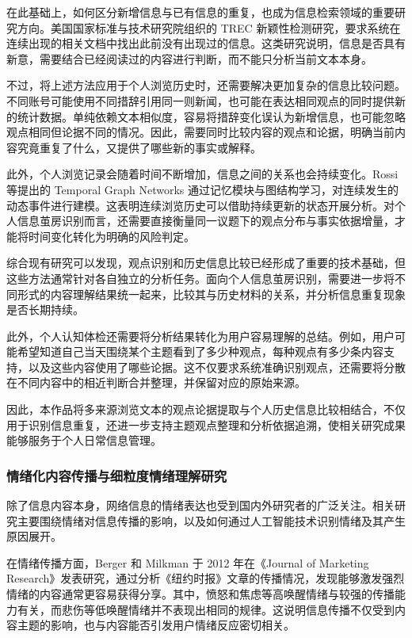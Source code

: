 在此基础上，如何区分新增信息与已有信息的重复，也成为信息检索领域的重要研究方向。美国国家标准与技术研究院组织的 TREC 新颖性检测研究，要求系统在连续出现的相关文档中找出此前没有出现过的信息\cite{ref35}。这类研究说明，信息是否具有新意，需要结合已经阅读过的内容进行判断，而不能只分析当前文本本身。

不过，将上述方法应用于个人浏览历史时，还需要解决更加复杂的信息比较问题。不同账号可能使用不同措辞引用同一则新闻，也可能在表达相同观点的同时提供新的统计数据。单纯依赖文本相似度，容易将措辞变化误认为新增信息，也可能忽略观点相同但论据不同的情况。因此，需要同时比较内容的观点和论据，明确当前内容究竟重复了什么，又提供了哪些新的事实或解释。

此外，个人浏览记录会随着时间不断增加，信息之间的关系也会持续变化。Rossi 等提出的 Temporal Graph Networks 通过记忆模块与图结构学习，对连续发生的动态事件进行建模\cite{ref16}。这表明连续浏览历史可以借助持续更新的状态开展分析。对个人信息茧房识别而言，还需要直接衡量同一议题下的观点分布与事实依据增量，才能将时间变化转化为明确的风险判定。

综合现有研究可以发现，观点识别和历史信息比较已经形成了重要的技术基础，但这些方法通常针对各自独立的分析任务。面向个人信息茧房识别，需要进一步将不同形式的内容理解结果统一起来，比较其与历史材料的关系，并分析信息重复现象是否长期持续。

此外，个人认知体检还需要将分析结果转化为用户容易理解的总结。例如，用户可能希望知道自己当天围绕某个主题看到了多少种观点，每种观点有多少条内容支持，以及这些内容使用了哪些论据。这不仅要求系统准确识别观点，还需要将分散在不同内容中的相近判断合并整理，并保留对应的原始来源。

因此，本作品将多来源浏览文本的观点论据提取与个人历史信息比较相结合，不仅用于识别信息重复，还进一步支持主题观点整理和分析依据追溯，使相关研究成果能够服务于个人日常信息管理。

\subsubsection{情绪化内容传播与细粒度情绪理解研究}\label{section:1.3.3}

除了信息内容本身，网络信息的情绪表达也受到国内外研究者的广泛关注。相关研究主要围绕情绪对信息传播的影响，以及如何通过人工智能技术识别情绪及其产生原因展开。

在情绪传播方面，Berger 和 Milkman 于 2012 年在《Journal of Marketing Research》发表研究，通过分析《纽约时报》文章的传播情况，发现能够激发强烈情绪的内容通常更容易获得分享\cite{ref36}。其中，愤怒和焦虑等高唤醒情绪与较强的传播能力有关，而悲伤等低唤醒情绪并不表现出相同的规律。这说明信息传播不仅受到内容主题的影响，也与内容能否引发用户情绪反应密切相关。


